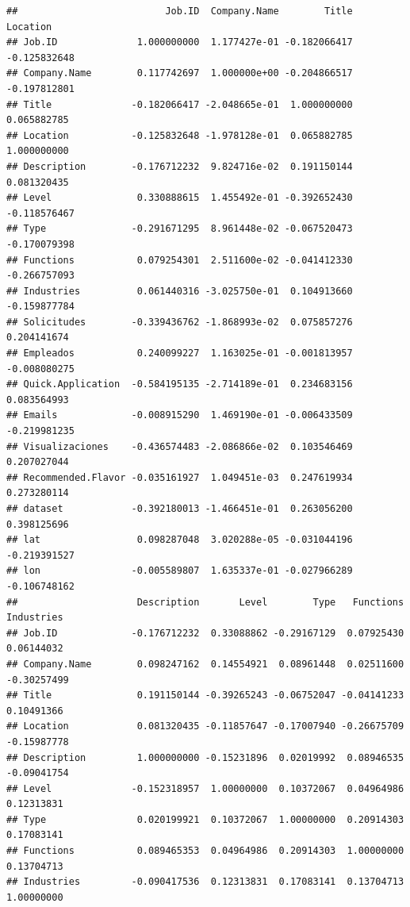 \documentclass[
]{article}
\newenvironment{Shaded}{\begin{snugshade}}{\end{snugshade}}
\newcommand{\NormalTok}[1]{\textcolor[rgb]{0.80,0.80,0.80}{#1}}
\newcommand{\OperatorTok}[1]{\textcolor[rgb]{0.94,0.94,0.82}{#1}}
\begin{document}
\begin{Shaded}
\end{Shaded}

\begin{verbatim}
##                          Job.ID  Company.Name        Title     Location
## Job.ID              1.000000000  1.177427e-01 -0.182066417 -0.125832648
## Company.Name        0.117742697  1.000000e+00 -0.204866517 -0.197812801
## Title              -0.182066417 -2.048665e-01  1.000000000  0.065882785
## Location           -0.125832648 -1.978128e-01  0.065882785  1.000000000
## Description        -0.176712232  9.824716e-02  0.191150144  0.081320435
## Level               0.330888615  1.455492e-01 -0.392652430 -0.118576467
## Type               -0.291671295  8.961448e-02 -0.067520473 -0.170079398
## Functions           0.079254301  2.511600e-02 -0.041412330 -0.266757093
## Industries          0.061440316 -3.025750e-01  0.104913660 -0.159877784
## Solicitudes        -0.339436762 -1.868993e-02  0.075857276  0.204141674
## Empleados           0.240099227  1.163025e-01 -0.001813957 -0.008080275
## Quick.Application  -0.584195135 -2.714189e-01  0.234683156  0.083564993
## Emails             -0.008915290  1.469190e-01 -0.006433509 -0.219981235
## Visualizaciones    -0.436574483 -2.086866e-02  0.103546469  0.207027044
## Recommended.Flavor -0.035161927  1.049451e-03  0.247619934  0.273280114
## dataset            -0.392180013 -1.466451e-01  0.263056200  0.398125696
## lat                 0.098287048  3.020288e-05 -0.031044196 -0.219391527
## lon                -0.005589807  1.635337e-01 -0.027966289 -0.106748162
##                     Description       Level        Type   Functions  Industries
## Job.ID             -0.176712232  0.33088862 -0.29167129  0.07925430  0.06144032
## Company.Name        0.098247162  0.14554921  0.08961448  0.02511600 -0.30257499
## Title               0.191150144 -0.39265243 -0.06752047 -0.04141233  0.10491366
## Location            0.081320435 -0.11857647 -0.17007940 -0.26675709 -0.15987778
## Description         1.000000000 -0.15231896  0.02019992  0.08946535 -0.09041754
## Level              -0.152318957  1.00000000  0.10372067  0.04964986  0.12313831
## Type                0.020199921  0.10372067  1.00000000  0.20914303  0.17083141
## Functions           0.089465353  0.04964986  0.20914303  1.00000000  0.13704713
## Industries         -0.090417536  0.12313831  0.17083141  0.13704713  1.00000000

\end{verbatim}
\end{document}
